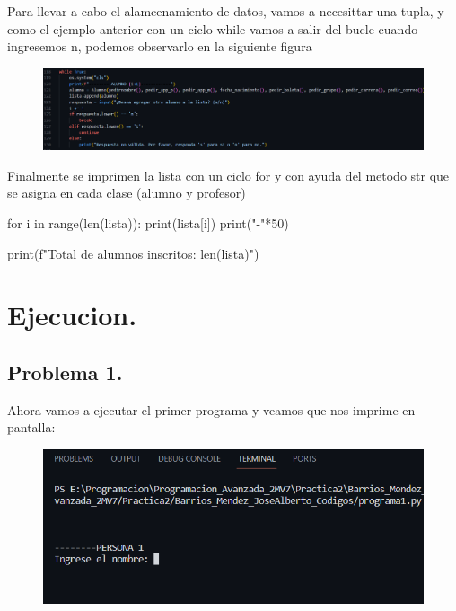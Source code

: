 \documentclass[12pt]{article}
\begin{document}
Para llevar a cabo el alamcenamiento de datos, vamos a necesittar una tupla, y como el ejemplo anterior con un ciclo while vamos a salir del bucle cuando ingresemos n, podemos observarlo en la siguiente figura
\begin{figure}[H]
		\begin{center}
 			\includegraphics[width = .9\textwidth]{12.png}
 			
		\end{center} 
\end{figure}
Finalmente se imprimen la lista con un ciclo for y con ayuda del metodo str que se asigna en cada clase (alumno y profesor)
\begin{python}[caption=Imprime la lista en consola ,label=python_example]
for i in range(len(lista)):
    print(lista[i])
    print("-"*50)

print(f"Total de alumnos inscritos: {len(lista)}")


\end{python}

\section{Ejecucion.}
\subsection{Problema 1.}
Ahora vamos a ejecutar el primer programa y veamos que nos imprime en pantalla: 
\begin{figure}[H]
		\begin{center}
 			\includegraphics[width = .8\textwidth]{07.png}
 			
		\end{center} 
\end{figure}
\end{document}
